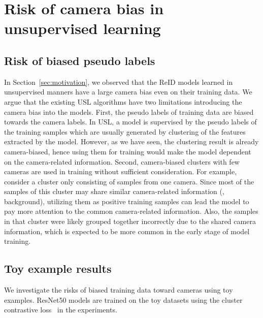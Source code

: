 \section{Risk of camera bias in unsupervised learning}
\label{sec:risk_usl}


\subsection{Risk of biased pseudo labels}
\label{subsec:biased_pseudo_labels}

In Section~\ref{sec:motivation}, we observed that the ReID models learned in unsupervised manners have a large camera bias even on their training data.
We argue that the existing USL algorithms have two limitations introducing the camera bias into the models.
First, the pseudo labels of training data are biased towards the camera labels.
In USL, a model is supervised by the pseudo labels of the training samples which are usually generated by clustering of the features extracted by the model.
However, as we have seen, the clustering result is already camera-biased, hence using them for training would make the model dependent on the camera-related information.
Second, camera-biased clusters with few cameras are used in training without sufficient consideration.
For example, consider a cluster only consisting of samples from one camera.
Since most of the samples of this cluster may share similar camera-related information (\eg, background), utilizing them as positive training samples can lead the model to pay more attention to the common camera-related information.
Also, the samples in that cluster were likely grouped together incorrectly due to the shared camera information, which is expected to be more common in the early stage of model training.

\subsection{Toy example results}
\label{subsec:toy_examples}

We investigate the risks of biased training data toward cameras using toy examples.
ResNet50 models are trained on the toy datasets using the cluster contrastive loss~\citep{dai2022cluster} in the experiments.

